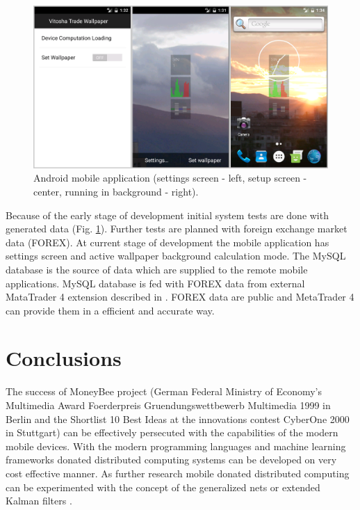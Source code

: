 \documentclass{llncs}
\begin{document}
\begin{figure}
  \includegraphics[width=1.0\linewidth]{fig02}
  \caption{Android mobile application (settings screen - left, setup screen - center, running in background - right).}
  \label{fig02}
\end{figure}
\FloatBarrier

Because of the early stage of development initial system tests are done with generated data (Fig. \ref{fig02}). Further tests are planned with foreign exchange market data (FOREX). At current stage of development the mobile application has settings screen and active wallpaper background calculation mode. The MySQL database is the source of data which are supplied to the remote mobile applications. MySQL database is fed with FOREX data from external MataTrader 4 extension described in \cite{balabanov05}. FOREX data are public and MetaTrader 4 \cite{blackledge01} can provide them in a efficient and accurate way. 

\section{Conclusions} \label{Conclusions}

The success of MoneyBee project (German Federal Ministry of Economy's Multimedia Award Foerderpreis Gruendungswettbewerb Multimedia 1999 in Berlin and the Shortlist 10 Best Ideas at the innovations contest CyberOne 2000 in Stuttgart) can be effectively persecuted with the capabilities of the modern mobile devices. With the modern programming languages and machine learning frameworks donated distributed computing systems can be developed on very cost effective manner. As further research mobile donated distributed computing can be experimented with the concept of the generalized nets \cite{tashev01,tashev02} or extended Kalman filters \cite{alexandrov01}.
\end{document}
